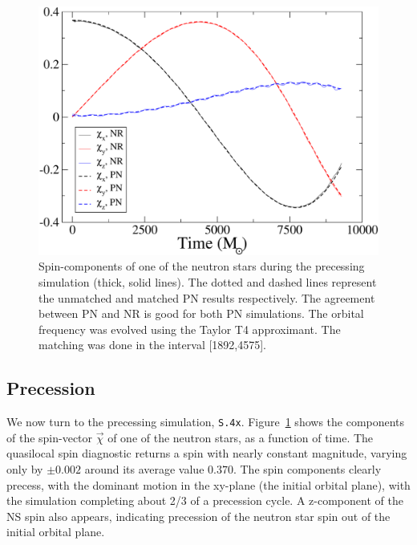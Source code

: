 \begin{figure}
\includegraphics[width=0.95\columnwidth]{chap2/SpinMatchedUnmatched}
  \caption[Spin-components of one of the neutron stars during the precessing simulation.]{\label{fig:FullPrec} Spin-components of one of the neutron
    stars during the precessing simulation (thick, solid lines). The
    dotted and dashed lines represent the unmatched and matched PN
    results respectively. The agreement between PN and NR is good for
    both PN simulations. The orbital frequency was evolved using the
    Taylor T4 approximant. The matching was done in the interval
    [1892,4575].}
\end{figure}

\subsection{Precession}


We now turn to the precessing simulation, {\tt S.4x}.
Figure~\ref{fig:FullPrec} shows the components of the spin-vector
$\vec\chi$ of one of the neutron stars, as a function of time. The
quasilocal spin diagnostic returns a spin with nearly constant
magnitude, varying only by $\pm 0.002$ around its average value
$0.370$. The spin components clearly precess, with the dominant
motion in the xy-plane (the initial orbital plane), with the
simulation completing about 2/3 of a precession cycle. A z-component
of the NS spin also appears, indicating precession of the neutron star
spin out of the initial orbital plane.

